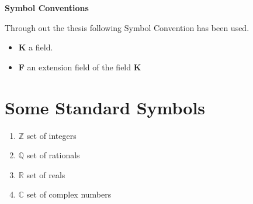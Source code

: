 
\hspace{-7mm}
  {\LARGE {\bfseries {Symbol Conventions}}}

  \vspace{7mm}

Through out the thesis following Symbol Convention has been used.\\[4mm]

\begin{itemize}
\item \textbf{K} \hspace{5mm} a field.
\item \textbf{F} \hspace{5mm} an extension field of the field \textbf{K}
\end{itemize}

\section*{Some Standard Symbols}
\begin{enumerate}
\item \(\mathbb{Z}\) \hspace{5mm} set of integers
\item \(\mathbb{Q}\) \hspace{5mm} set of rationals
\item \(\mathbb{R}\) \hspace{5mm} set of reals
\item \(\mathbb{C}\) \hspace{5mm} set of complex numbers
\end{enumerate}
